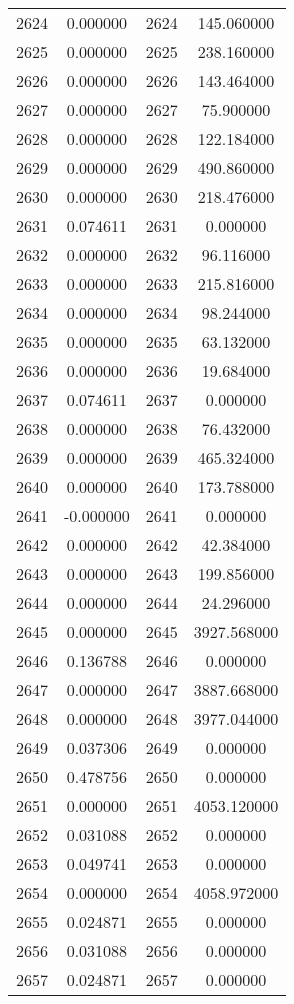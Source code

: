 \documentclass[12pt]{article}
\begin{document}
\begin{longtable}{@{}cccc@{}}
2624 & 0.000000 & 2624 & 145.060000 \\
2625 & 0.000000 & 2625 & 238.160000 \\
2626 & 0.000000 & 2626 & 143.464000 \\
2627 & 0.000000 & 2627 & 75.900000 \\
2628 & 0.000000 & 2628 & 122.184000 \\
2629 & 0.000000 & 2629 & 490.860000 \\
2630 & 0.000000 & 2630 & 218.476000 \\
2631 & 0.074611 & 2631 & 0.000000 \\
2632 & 0.000000 & 2632 & 96.116000 \\
2633 & 0.000000 & 2633 & 215.816000 \\
2634 & 0.000000 & 2634 & 98.244000 \\
2635 & 0.000000 & 2635 & 63.132000 \\
2636 & 0.000000 & 2636 & 19.684000 \\
2637 & 0.074611 & 2637 & 0.000000 \\
2638 & 0.000000 & 2638 & 76.432000 \\
2639 & 0.000000 & 2639 & 465.324000 \\
2640 & 0.000000 & 2640 & 173.788000 \\
2641 & -0.000000 & 2641 & 0.000000 \\
2642 & 0.000000 & 2642 & 42.384000 \\
2643 & 0.000000 & 2643 & 199.856000 \\
2644 & 0.000000 & 2644 & 24.296000 \\
2645 & 0.000000 & 2645 & 3927.568000 \\
2646 & 0.136788 & 2646 & 0.000000 \\
2647 & 0.000000 & 2647 & 3887.668000 \\
2648 & 0.000000 & 2648 & 3977.044000 \\
2649 & 0.037306 & 2649 & 0.000000 \\
2650 & 0.478756 & 2650 & 0.000000 \\
2651 & 0.000000 & 2651 & 4053.120000 \\
2652 & 0.031088 & 2652 & 0.000000 \\
2653 & 0.049741 & 2653 & 0.000000 \\
2654 & 0.000000 & 2654 & 4058.972000 \\
2655 & 0.024871 & 2655 & 0.000000 \\
2656 & 0.031088 & 2656 & 0.000000 \\
2657 & 0.024871 & 2657 & 0.000000 \\

\end{longtable}
\end{document}
